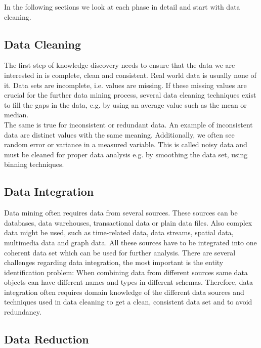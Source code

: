 In the following sections we look at each phase in detail and start with data cleaning. 

\subsection{Data Cleaning} 
The first step of knowledge discovery needs to ensure that the data we are interested in is complete, clean and consistent. Real world data is usually none of it. Data sets are incomplete, i.e. values are missing. If these missing values are crucial for the further data mining process, several data cleaning techniques exist to fill the gaps in the data, e.g. by using an average value such as the mean or median.
\\
The same is true for inconsistent or redundant data. An example of inconsistent data are distinct values with the same meaning. Additionally, we often see random error or variance in a measured variable. This is called noisy data and must be cleaned for proper data analysis e.g. by smoothing the data set, using binning techniques.


\subsection{Data Integration}

Data mining often requires data from several sources. These sources can be databases, data warehouses, transactional data or plain data files. Also complex data might be used, such as time-related data, data streams, spatial data, multimedia data and graph data. All these sources have to be integrated into one coherent data set which can be used for further analysis. There are several challenges regarding data integration, the most important is the entity identification problem: When combining data from different sources same data objects can have different names and types in different schemas. Therefore, data integration often requires domain knowledge of the different data sources and techniques used in data cleaning to get a clean, consistent data set and to avoid redundancy.


\subsection{Data Reduction}

